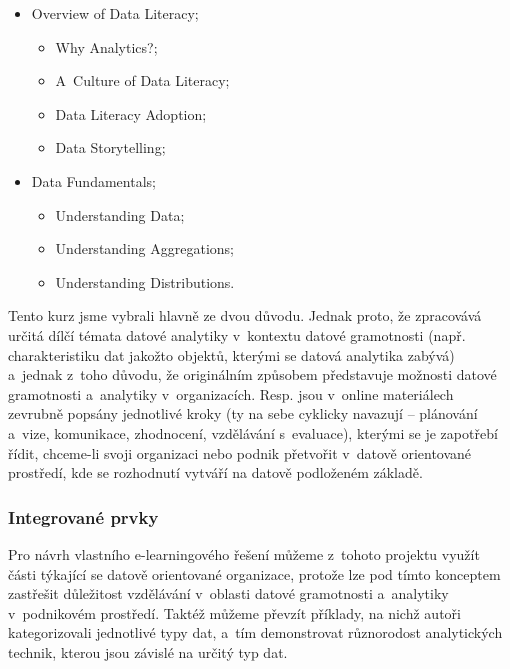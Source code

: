\begin{itemize}
\tightlist
\item
  Overview of Data Literacy;

  \begin{itemize}
  \tightlist
  \item
    Why Analytics?;
  \item
    A~Culture of Data Literacy;
  \item
    Data Literacy Adoption;
  \item
    Data Storytelling;
  \end{itemize}
\item
  Data Fundamentals;

  \begin{itemize}
  \tightlist
  \item
    Understanding Data;
  \item
    Understanding Aggregations;
  \item
    Understanding Distributions.
  \end{itemize}
\end{itemize}

Tento kurz jsme vybrali hlavně ze dvou důvodu. Jednak proto, že zpracovává určitá dílčí témata datové analytiky v~kontextu datové gramotnosti (např. charakteristiku dat jakožto objektů, kterými se datová analytika zabývá) a~jednak z~toho důvodu, že originálním způsobem představuje možnosti datové gramotnosti a~analytiky v~organizacích. Resp. jsou v~online materiálech zevrubně popsány jednotlivé kroky (ty na sebe cyklicky navazují -- plánování a~vize, komunikace, zhodnocení, vzdělávání s~evaluace), kterými se je zapotřebí řídit, chceme-li svoji organizaci nebo podnik přetvořit v~datově orientované prostředí, kde se rozhodnutí vytváří na datově podloženém základě.

\hypertarget{integrovanuxe9-prvky-2}{%
\subsubsection{Integrované prvky}\label{integrovanuxe9-prvky-2}}

Pro návrh vlastního e-learningového řešení můžeme z~tohoto projektu využít části týkající se datově orientované organizace, protože lze pod tímto konceptem zastřešit důležitost vzdělávání v~oblasti datové gramotnosti a~analytiky v~podnikovém prostředí. Taktéž můžeme převzít příklady, na nichž autoři kategorizovali jednotlivé typy dat, a~tím demonstrovat různorodost analytických technik, kterou jsou závislé na určitý typ dat.

